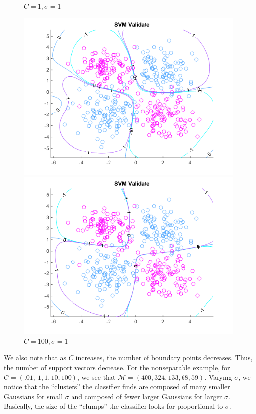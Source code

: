 \documentclass[10pt,letterpaper]{article}
\begin{document}
\begin{center}
\begin{figure}[!htb]
  \caption{$C = 1, \sigma = 1$}
\endminipage
\end{figure}
\begin{figure}[!htb]
\hspace{.16\textwidth}
  \includegraphics[width=\linewidth]{figures/C10sigma1.png}
  \caption{$C = 10, \sigma = 1$}
\endminipage
{}
  \includegraphics[width=\linewidth]{figures/C100sigma1.png}
  \caption{$C = 100, \sigma = 1$}\label{fig:c100}
\endminipage
\end{figure}
\end{center}

We also note that as $C$ increases, the number of boundary points decreases. Thus, the number of support vectors decrease. For the nonseparable example, for $C = (.01, .1, 1, 10, 100)$, we see that $\mathcal{M} = (400, 324, 133, 68, 59)$. Varying $\sigma$, we notice that the ``clusters'' the classifier finds are composed of many smaller Gaussians for small $\sigma$ and composed of fewer larger Gaussians for larger $\sigma$. Basically, the size of the ``clumps'' the classifier looks for proportional to $\sigma$.
\end{document}
